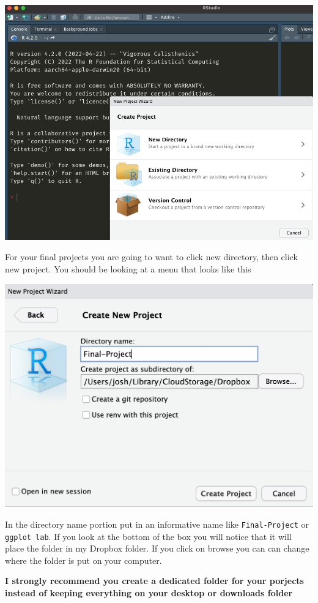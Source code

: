 \documentclass[
  letterpaper,
  DIV=11,
  numbers=noendperiod,
  oneside]{scrreprt}
\begin{document}
\includegraphics{figs/r-projects-menu.png}

For your final projects you are going to want to click new directory,
then click new project. You should be looking at a menu that looks like
this

\includegraphics{figs/projects-directory-name.png}

In the directory name portion put in an informative name like
\texttt{Final-Project} or \texttt{ggplot\ lab}. If you look at the
bottom of the box you will notice that it will place the folder in my
Dropbox folder. If you click on browse you can can change where the
folder is put on your computer.

\textbf{I strongly recommend you create a dedicated folder for your
porjects instead of keeping everything on your desktop or downloads
folder}
\end{document}
